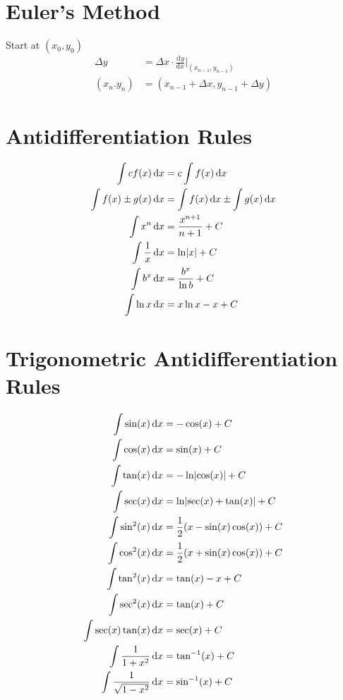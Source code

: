 \documentclass[12pt]{article}
\DeclarePairedDelimiter\abs{\lvert}{\rvert}
\newcommand*{\asin}{\sin^{-1}}
\newcommand*{\atan}{\tan^{-1}}
\newcommand*{\dd}[3][]{\tfrac{\mathrm{d}^{#1}#2}{\mathrm{d}#3^{#1}}}
\newcommand*{\D}[1]{\mathop{}\!\mathrm{d}#1}
\newcommand*{\fixmath}{%
  \makebox{}\vspace{\glueexpr-\baselineskip-\abovedisplayskip}}
\newenvironment{fixbskip}{\setlength{\belowdisplayskip}{0pt}\ignorespaces}%
  {\ignorespacesafterend}
\newenvironment{fixskip}{\setlength{\abovedisplayskip}{0pt}%
  \setlength{\belowdisplayskip}{0pt}\fixmath\ignorespaces}%
  {\ignorespacesafterend}
\begin{document}
\section*{Euler's Method}
Start at \((x_0,y_0)\)
\begin{fixbskip}
  \begin{align*}
    \Delta y &= \Delta x \cdot \dd{y}{x} \bigg|_{(x_{n-1},y_{n-1})}\\
    (x_n.y_n) &= (x_{n-1} + \Delta x, y_{n-1} + \Delta y)
  \end{align*}
\end{fixbskip}
\section*{Antidifferentiation Rules}
\begin{fixskip}
  \begin{align*}
    \int cf(x) \D{x} &= c \int f(x) \D{x}\\
    \int f(x) \pm g(x) \D{x} &= \int f(x) \D{x} \pm \int g(x) \D{x}\\
    \int x^n \D{x} &= \frac{x^{n+1}}{n+1} + C\\
    \int \frac{1}{x} \D{x} &= \ln\abs*{x} + C\\
    \int b^x \D{x} &= \frac{b^x}{\ln b} + C\\
    \int \ln x \D{x} &= x\ln x - x + C
  \end{align*}
\end{fixskip}
\section*{Trigonometric Antidifferentiation Rules}
\begin{fixskip}
  \begin{align*}
    \int \sin(x) \D{x} &= -\cos(x) + C\\
    \int \cos(x) \D{x} &= \sin(x) + C\\
    \int \tan(x) \D{x} &= -\ln\abs*{\cos(x)} + C\\
    \int \sec(x) \D{x} &= \ln\abs*{\sec(x)+\tan(x)} + C\\
    \int \sin^2(x) \D{x} &= \frac{1}{2} (x - \sin(x)\cos(x)) + C\\
    \int \cos^2(x) \D{x} &= \frac{1}{2} (x + \sin(x)\cos(x)) + C\\
    \int \tan^2(x) \D{x} &= \tan(x) - x + C\\
    \int \sec^2(x) \D{x} &= \tan(x) + C\\
    \int \sec(x) \tan(x) \D{x} &= \sec(x) + C\\
    \int \frac{1}{1+x^2} \D{x} &= \atan(x) + C\\
    \int \frac{1}{\sqrt{1-x^2}} \D{x} &= \asin(x) + C
  \end{align*}
\end{fixskip}
\end{document}
